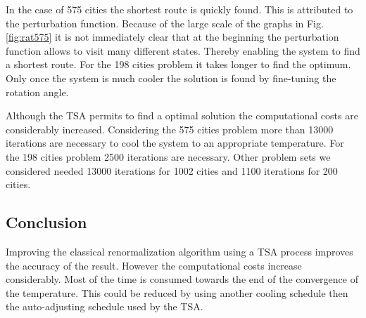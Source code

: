 In the case of 575 cities the shortest route is quickly found. This is
attributed to the perturbation function. Because of the large scale of the
graphs in Fig. \ref{fig:rat575} it is not immediately clear that at the
beginning the perturbation function allows to visit many different states.
Thereby enabling the system to find a shortest route. For the 198 cities
problem it takes longer to find the optimum. Only once the system is much
cooler the solution is found by fine-tuning the rotation angle.

Although the TSA permits to find a optimal solution the computational costs
are considerably increased. Considering the 575 cities problem more than 13000
iterations are necessary to cool the system to an appropriate temperature. For
the 198 cities problem 2500 iterations are necessary. Other problem sets
we considered needed 13000 iterations for 1002 cities and 1100 iterations for
200 cities.

\subsection{Conclusion}
Improving the classical renormalization algorithm using a TSA process improves
the accuracy of the result. However the computational costs increase considerably.
Most of the time is consumed towards the end of the convergence of the
temperature. This could be reduced by using another cooling schedule then the 
auto-adjusting schedule used by the TSA.




